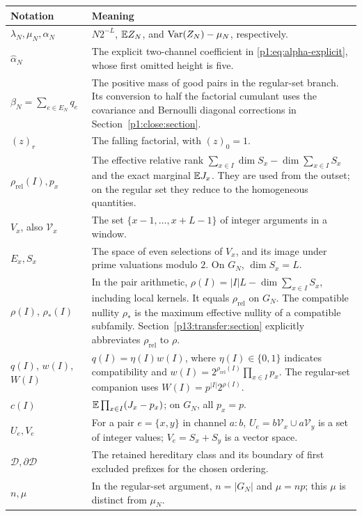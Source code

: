 \begin{center}
\small
\begin{tabularx}{\textwidth}{@{}>{\raggedright\arraybackslash}p{}>{\raggedright\arraybackslash}X@{}}
\toprule
Notation & Meaning\\
\midrule
\(\lambda_N,\mu_N,\alpha_N\)
& \(N2^{-L}\), \(\mathbb E Z_N\), and
\(\operatorname{Var}(Z_N)-\mu_N\), respectively.\\[3pt]
\(\widehat\alpha_N\)
& The explicit two-channel coefficient in
\eqref{p1:eq:alpha-explicit}, whose first omitted height
is five.\\[3pt]
\(\beta_N=\sum_{e\in E_N}q_e\)
& The positive mass of good pairs in the regular-set branch.
Its conversion to half
the factorial cumulant uses the covariance and Bernoulli
diagonal corrections in Section~\ref{p1:close:section}.\\[3pt]
\((z)_r\)
& The falling factorial, with \((z)_0=1\).\\[3pt]
\(\rho_{\mathrm{rel}}(I),p_x\)
& The effective relative rank
\(\sum_{x\in I}\dim S_x-\dim\sum_{x\in I}S_x\)
and the exact marginal \(\mathbb E J_x\).
They are used from the outset; on the regular set they
reduce to the homogeneous quantities.\\[3pt]
\(V_x\), also \(\mathcal V_x\)
& The set \(\{x-1,\ldots,x+L-1\}\) of integer
arguments in a window.\\[3pt]
\(E_x,S_x\)
& The space of even selections of \(V_x\), and its image
under prime valuations modulo \(2\).
On \(G_N\), \(\dim S_x=L\).\\[3pt]
\(\rho(I)\), \(\rho_*(I)\)
& In the pair arithmetic, \(\rho(I)=|I|L-\dim\sum_{x\in I}S_x\),
including local kernels. It equals \(\rho_{\mathrm{rel}}\) on \(G_N\).
The compatible nullity \(\rho_*\) is the maximum effective nullity
of a compatible subfamily. Section~\ref{p13:transfer:section}
explicitly abbreviates \(\rho_{\mathrm{rel}}\) to \(\rho\).\\[3pt]
\(q(I)\), \(w(I)\), \(W(I)\)
& \(q(I)=\eta(I)w(I)\), where \(\eta(I)\in\{0,1\}\)
indicates compatibility and
\(w(I)=2^{\rho_{\mathrm{rel}}(I)}\prod_{x\in I}p_x\).
The regular-set companion uses \(W(I)=p^{|I|}2^{\rho(I)}\).\\[3pt]
\(c(I)\)
& \(\mathbb E\prod_{x\in I}(J_x-p_x)\); on \(G_N\),
all \(p_x=p\).\\[3pt]
\(U_e,V_e\)
& For a pair \(e=\{x,y\}\) in channel \(a:b\),
\(U_e=b\mathcal V_x\cup a\mathcal V_y\) is a set
of integer values; \(V_e=S_x+S_y\) is a vector space.\\[3pt]
\(\mathscr D,\partial\mathscr D\)
& The retained hereditary class and its boundary of
first excluded prefixes for the chosen ordering.\\[3pt]
\(n,\mu\)
& In the regular-set argument, \(n=|G_N|\) and
\(\mu=np\); this \(\mu\) is distinct from \(\mu_N\).\\
\bottomrule
\end{tabularx}
\end{center}

